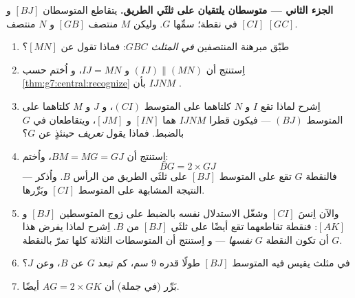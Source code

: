 \begin{problem}
\medskip
\noindent\textbf{الجزء الثاني --- متوسطان يلتقيان على ثلثَي
الطريق.}
يتقاطع المتوسطان $[BJ]$ و $[CI]$ في نقطة؛ سمِّها $G$. وليكن
$M$ منتصف $[GB]$ و $N$ منتصف $[GC]$.
\begin{enumerate}[resume]
  \item طبّق مبرهنة المنتصفين \emph{في المثلث $GBC$}:
        فماذا تقول عن  $[MN]$؟
  \item اِستنتج أن $(IJ) \parallel (MN)$ و $IJ = MN$، و
        اُختم حسب \cref{thm:g7:central:recognize} بأن $IJNM$
        .
  \item اِشرح لماذا تقع $I$ و $N$ كلتاهما على المتوسط $(CI)$،
        و $J$ و $M$ كلتاهما على المتوسط $(BJ)$ --- فيكون
        قطرا  $IJNM$ هما $[IN]$ و
        $[JM]$، ويتقاطعان في $G$ بالضبط. فماذا يقول
        \emph{تعريف}  حينئذٍ عن $G$؟
  \item اِستنتج أن $BM = MG = GJ$، واُختم:
        \[
        BG = 2 \times GJ
        \]
        --- فالنقطة $G$ تقع على المتوسط $[BJ]$ على ثلثَي
        الطريق من الرأس $B$. واُذكر النتيجة المشابهة على
        المتوسط $[CI]$ وبَرِّرها.
  \item والآن اِنسَ $[CI]$ وشغّل الاستدلال نفسه بالضبط على
        زوج المتوسطين $[BJ]$ و $[AK]$: فنقطة تقاطعهما
        تقع أيضًا على ثلثَي $[BJ]$ من $B$. اِشرح لماذا
        يفرض هذا أن تكون النقطة $G$ \emph{نفسها} --- و
        اِستنتج أن المتوسطات الثلاثة كلها تمرّ بالنقطة $G$.
  \item في مثلث يقيس فيه المتوسط $[BJ]$ طولًا قدره $9$ سم،
        كم تبعد $G$ عن $B$، وعن $J$؟
  \item بَرِّر (في جملة) أن $AG = 2 \times GK$ أيضًا.
\end{enumerate}


\end{problem}
